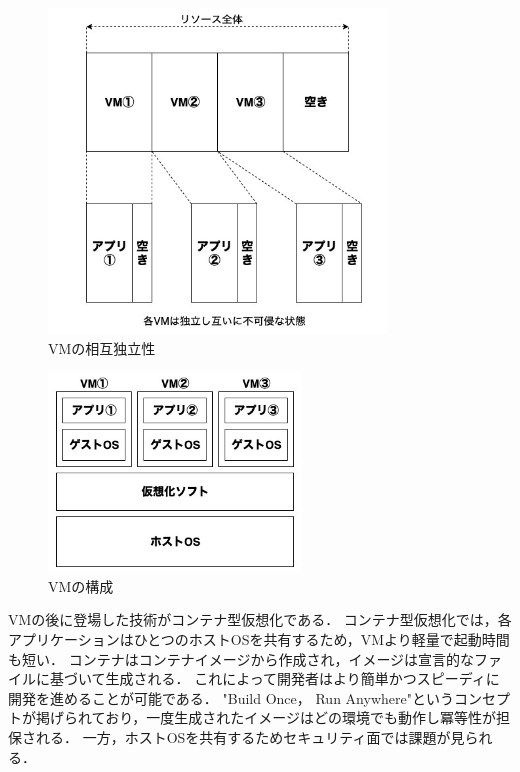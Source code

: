 \begin{figure}[htbp]
\begin{center}
    \includegraphics[width=0.8\textwidth]{./figures/resource-on-vm.jpg}
    \caption{VMの相互独立性}
\end{center}
\end{figure}

\begin{figure}[htbp]
\begin{center}
    \includegraphics[width=0.6\textwidth]{./figures/vm-structure.jpg}
    \caption{VMの構成}
\end{center}
\end{figure}

VMの後に登場した技術がコンテナ型仮想化である．
コンテナ型仮想化では，各アプリケーションはひとつのホストOSを共有するため，VMより軽量で起動時間も短い．
コンテナはコンテナイメージから作成され，イメージは宣言的なファイルに基づいて生成される．
これによって開発者はより簡単かつスピーディに開発を進めることが可能である．
"Build Once， Run Anywhere"というコンセプトが掲げられており，一度生成されたイメージはどの環境でも動作し冪等性が担保される．
一方，ホストOSを共有するためセキュリティ面では課題が見られる．

